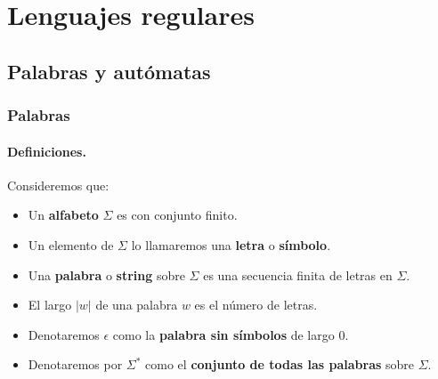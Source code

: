 \section{Lenguajes regulares}

\subsection{Palabras y autómatas}

\subsubsection{Palabras}

\paragraph{Definiciones.} Consideremos que:

\begin{itemize}
    \item Un \textbf{alfabeto} $\Sigma$ es con conjunto finito.
    \item Un elemento de $\Sigma$ lo llamaremos una \textbf{letra} o \textbf{símbolo}.
    \item Una \textbf{palabra} o \textbf{string} sobre $\Sigma$ es una secuencia finita de letras en $\Sigma$.
    \item El largo $|w|$ de una palabra $w$ es el número de letras.
    \item Denotaremos $\epsilon$ como la \textbf{palabra sin símbolos} de largo $0$.
    \item Denotaremos por $\Sigma^*$ como el \textbf{conjunto de todas las palabras} sobre $\Sigma$.
\end{itemize}

